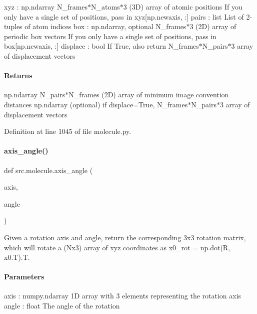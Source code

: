 xyz \+: np.\+ndarray N\+\_\+frames$\ast$\+N\+\_\+atoms$\ast$3 (3D) array of atomic positions If you only have a single set of positions, pass in xyz\mbox{[}np.\+newaxis, \+:\mbox{]} pairs \+: list List of 2-\/tuples of atom indices box \+: np.\+ndarray, optional N\+\_\+frames$\ast$3 (2D) array of periodic box vectors If you only have a single set of positions, pass in box\mbox{[}np.\+newaxis, \+:\mbox{]} displace \+: bool If True, also return N\+\_\+frames$\ast$\+N\+\_\+pairs$\ast$3 array of displacement vectors

\paragraph*{Returns }

np.\+ndarray N\+\_\+pairs$\ast$\+N\+\_\+frames (2D) array of minimum image convention distances np.\+ndarray (optional) if displace=True, N\+\_\+frames$\ast$\+N\+\_\+pairs$\ast$3 array of displacement vectors 

Definition at line 1045 of file molecule.\+py.

\mbox{\label{namespacesrc_1_1molecule_a18b08895867e37ef3cb86a3d4456c775}} 
\paragraph{\texorpdfstring{axis\+\_\+angle()}{axis\_angle()}}
{\footnotesize\ttfamily def src.\+molecule.\+axis\+\_\+angle (\begin{DoxyParamCaption}\item[{}]{axis,  }\item[{}]{angle }\end{DoxyParamCaption})}



Given a rotation axis and angle, return the corresponding 3x3 rotation matrix, which will rotate a (Nx3) array of xyz coordinates as x0\+\_\+rot = np.\+dot(R, x0.\+T).T. 

\paragraph*{Parameters }

axis \+: numpy.\+ndarray 1D array with 3 elements representing the rotation axis angle \+: float The angle of the rotation

